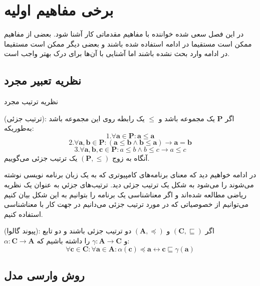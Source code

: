 \pagestyle{plain}
\setcounter{page}{1}

\chapter{برخی مفاهیم اولیه}
در این فصل سعی شده خواننده با مفاهیم مقدماتی کار آشنا شود. بعضی از مفاهیم ممکن است مستقیما در ادامه استفاده شده باشند و بعضی دیگر ممکن است مستقیما در ادامه وارد بحث نشده باشند اما آشنایی با آن‌ها برای درک بهتر واجب است. 
\section{نظریه تعبیر مجرد}

نظریه ترتیب مجرد 

\begin{defn}
	(ترتیب جزئی):
	اگر 
	$\mathbf{P}$
	یک مجموعه باشد و 
	$\mathbb{\leq}$
	یک رابطه روی این مجموعه باشد به‌طوریکه:
	$$
	1.\forall \mathbf{a} \in \mathbf{P}: \mathbf{a\leq a}$$
	$$2.\forall \mathbf{a,b} \in \mathbf{P}: (\mathbf{a \leq b \land b \leq a}) \rightarrow
	\mathbf{a=b} $$ 
	$$3.\forall \mathbf{a,b,c} \in \mathbf{P}: a \leq b \land b \leq c \rightarrow a \leq c$$
	آنگاه به زوج 
	$(\mathbf{P},\leq)$
	یک ترتیب جزئی می‌گوییم.
	
\end{defn}

در ادامه خواهیم دید که معنای برنامه‌های کامپیوتری که به یک زبان برنامه نویسی نوشته می‌شوند را می‌شود به شکل یک ترتیب جزئی دید. ترتیب‌های جزئي به عنوان یک نظریه ریاضی مطالعه شده‌اند و اگر معناشناسی یک برنامه را بتوانیم به این شکل بیان کنیم می‌توانیم از خصوصیاتی که در مورد ترتیب جزئی می‌دانیم در جهت کار با معناشناسی استفاده کنیم. 

\begin{defn}
	(پیوند گالوا):
	اگر 
	$(\mathbf{C},\sqsubseteq)$
	و
	$(\mathbf{A},\preceq)$
	دو ترتیب جزئی باشند و دو تابع \\
	$\alpha : \mathbf{C \rightarrow A}$
	و
	$\gamma : \mathbf{A \rightarrow C}$
	را داشته باشیم که:
	$$
	\forall \mathbf{c \in C}: \forall \mathbf{a \in A}: 
	\alpha(\mathbf{c}) \preceq \mathbf{a} \leftrightarrow 
	\mathbf{c} \sqsubseteq \gamma(\mathbf{a})
	$$
\end{defn}


\section{روش وارسی مدل}


